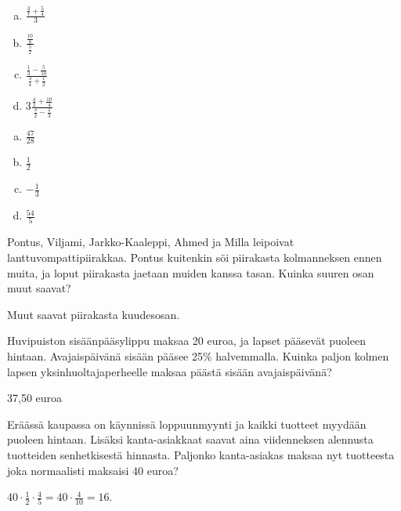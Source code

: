 \begin{tehtava} %

\begin{enumerate}[a)]
	\item $ \frac{\frac{3}{7} + \frac{5}{4}}{3}$
	\item $ \frac{\frac{10}{8}}{\frac{5}{2}}$
	\item $ \frac{\frac{1}{3} - \frac{5}{10}}{\frac{3}{4} + \frac{1}{2}}$
	\item $ 3\frac{\frac{4}{2} + \frac{10}{4}}{\frac{3}{2} - \frac{2}{3}}$
\end{enumerate}
    \begin{vastaus}		
		\begin{enumerate}[a)]
			\item $\frac{47}{28}$
			\item $\frac{1}{2}$
			\item $-\frac{1}{3}$
			\item $\frac{54}{5}$
		\end{enumerate}
    \end{vastaus}
\end{tehtava}

\begin{tehtava} %
    Pontus, Viljami, Jarkko-Kaaleppi, Ahmed ja Milla leipoivat lanttuvompattipiirakkaa.
    Pontus kuitenkin söi piirakasta kolmanneksen ennen muita, ja loput piirakasta
    jaetaan muiden kanssa tasan. Kuinka suuren osan muut saavat?
    
    \begin{vastaus}
        Muut saavat piirakasta kuudesosan.
    \end{vastaus}
\end{tehtava}

\begin{tehtava} %
    Huvipuiston sisäänpääsylippu maksaa 20 euroa, ja lapset pääsevät puoleen
    hintaan. Avajaispäivänä sisään pääsee 25\% halvemmalla. Kuinka paljon kolmen
    lapsen yksinhuoltajaperheelle maksaa päästä sisään avajaispäivänä?
    
    \begin{vastaus}
        37,50 euroa
    \end{vastaus}
\end{tehtava}

\begin{tehtava}
	Eräässä kaupassa on käynnissä loppuunmyynti ja kaikki tuotteet myydään puoleen hintaan. 
	Lisäksi kanta-asiakkaat saavat aina viidenneksen alennusta tuotteiden senhetkisestä hinnasta.
	Paljonko kanta-asiakas maksaa nyt tuotteesta joka normaalisti maksaisi 40 euroa?
	\begin{vastaus}
	$40\cdot \frac{1}{2} \cdot \frac{4}{5}=40\cdot \frac{4}{10}= 16$. 
	\end{vastaus}
\end{tehtava}

